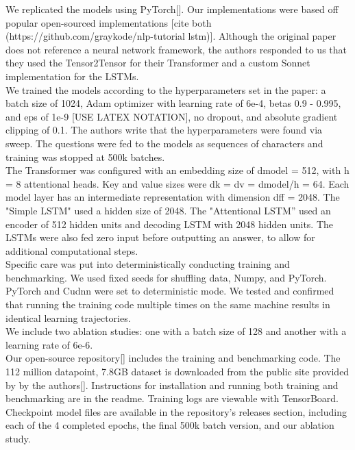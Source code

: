 We replicated the models using PyTorch[]. Our implementations were based off popular open-sourced implementations [cite both (https://github.com/graykode/nlp-tutorial lstm)]. Although the original paper does not reference a neural network framework, the authors responded to us that they used the Tensor2Tensor for their Transformer and a custom Sonnet implementation for the LSTMs.\\

We trained the models according to the hyperparameters set in the paper: a batch size of 1024, Adam optimizer with learning rate of 6e-4, betas 0.9 - 0.995, and eps of 1e-9 [USE LATEX NOTATION], no dropout, and absolute gradient clipping of 0.1. The authors write that the hyperparameters were found via sweep. The questions were fed to the models as sequences of characters and training was stopped at 500k batches.\\

The Transformer was configured with an embedding size of dmodel = 512, with h = 8 attentional heads. Key and value sizes were dk = dv = dmodel/h = 64. Each model layer has an intermediate representation with dimension dff = 2048. The "Simple LSTM" used a hidden size of 2048. The "Attentional LSTM” used an encoder of 512 hidden units and decoding LSTM with 2048 hidden units. The LSTMs were also fed zero input before outputting an answer, to allow for additional computational steps. \\

Specific care was put into deterministically conducting training and benchmarking. We used fixed seeds for shuffling data, Numpy, and PyTorch. PyTorch and Cudnn were set to deterministic mode. We tested and confirmed that running the training code multiple times on the same machine results in identical learning trajectories. \\

We include two ablation studies: one with a batch size of 128 and another with a learning rate of 6e-6. \\

Our open-source repository[] includes the training and benchmarking code. The 112 million datapoint, 7.8GB dataset is downloaded from the public site provided by by the authors[]. Instructions for installation and running both training and benchmarking are in the readme. Training logs are viewable with TensorBoard. Checkpoint model files are available in the repository's releases section, including each of the 4 completed epochs, the final 500k batch version, and our ablation study. \\

